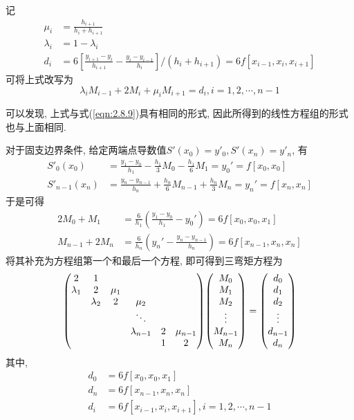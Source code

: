 记
\begin{align*}
    \mu_i&=\frac{h_{i+1}}{h_i+h_{i+1}}\\
    \lambda_i&=1-\lambda_i\\
    d_i&=6\left[\frac{y_{i+1}-y_i}{h_{i+1}}-\frac{y_i-y_{i-1}}{h_i}\right]/(h_i+h_{i+1})=6f[x_{i-1},x_i,x_{i+1}]
\end{align*}
可将上式改写为
\begin{equation*}
    \lambda_iM_{i-1}+2M_i+\mu_iM_{i+1}=d_i, i=1,2,\cdots,n-1
\end{equation*}

可以发现, 上式与式(\ref{eqn:2.8.9})具有相同的形式, 因此所得到的线性方程组的形式也与上面相同.

对于固支边界条件, 给定两端点导数值$S'(x_0)=y'_0,S'(x_n)=y'_n$, 有
\begin{align*}
    S'_0(x_0)&=\frac{y_1-y_0}{h_1}-\frac{h_1}{3}M_0-\frac{h_1}{6}M_1=y_0'=f[x_0,x_0]\\
    S'_{n-1}(x_n)&=\frac{y_n-y_{n-1}}{h_n}+\frac{h_n}{6}M_{n-1}+\frac{h_n}{3}M_n=y_n'=f[x_n,x_n]
\end{align*}
于是可得
\begin{align*}
    2M_0+M_1&=\frac{6}{h_1}\left(\frac{y_1-y_0}{h_1}-y_0'\right)=6f[x_0,x_0,x_1]\\
    M_{n-1}+2M_n&=\frac{6}{h_n}\left(y_n'-\frac{y_n-y_{n-1}}{h_n}\right)=6f[x_{n-1},x_n,x_n]
\end{align*}
将其补充为方程组第一个和最后一个方程, 即可得到三弯矩方程为
\begin{equation*}
    \mqty(
        2&1& & & &\\
        \lambda_1&2&\mu_1& & &\\
         &\lambda_2&2&\mu_2& &\\
         & & &\ddots& &\\
         & & & \lambda_{n-1}&2&\mu_{n-1}\\
         & & & &1&2
    )\mqty(M_0\\M_1\\M_2\\\vdots\\M_{n-1}\\M_n)=\mqty(d_0\\d_1\\d_2\\\vdots\\d_{n-1}\\d_n)
\end{equation*}
其中,
\begin{align*}
    d_0&=6f[x_0,x_0,x_1]\\
    d_n&=6f[x_{n-1},x_n,x_n]\\
    d_i&=6f[x_{i-1},x_i,x_{i+1}],i=1,2,\cdots,n-1
\end{align*}


